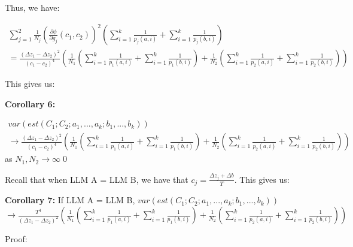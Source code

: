 \documentclass{article}
\begin{document}
Thus, we have:

$\displaystyle  \begin{array}{l}
\sum _{j=1}^{2}\frac{1}{N_{j}}\left(\frac{\partial \phi }{\partial g_{j}}\left( c_{1} ,c_{2}\right)\right)^{2}\left(\sum _{i=1}^{k}\frac{1}{p_{j}\left( a,i\right)} +\sum _{i=1}^{k}\frac{1}{p_{j}\left( b,i\right)}\right)\\
=\frac{\left( \Delta z_{1} -\Delta z_{2}\right)^{2}}{\left( c_{1} -c_{2}\right)^{4}}\left(\frac{1}{N_{1}}\left(\sum _{i=1}^{k}\frac{1}{p_{1}\left( a,i\right)} +\sum _{i=1}^{k}\frac{1}{p_{1}\left( b,i\right)}\right) +\frac{1}{N_{2}}\left(\sum _{i=1}^{k}\frac{1}{p_{2}\left( a,i\right)} +\sum _{i=1}^{k}\frac{1}{p_{2}\left( b,i\right)}\right)\right)
\end{array}$



This gives us:



\textbf{Corollary 6:}

$\displaystyle  \begin{array}{l}
var\left( est\left( C_{1} ;C_{2} ;a_{1} ,...,a_{k} ;b_{1} ,...,b_{k}\right)\right)\\
\rightarrow \frac{\left( \Delta z_{1} -\Delta z_{2}\right)^{2}}{\left( c_{1} -c_{2}\right)^{4}}\left(\frac{1}{N_{1}}\left(\sum _{i=1}^{k}\frac{1}{p_{1}\left( a,i\right)} +\sum _{i=1}^{k}\frac{1}{p_{1}\left( b,i\right)}\right) +\frac{1}{N_{2}}\left(\sum _{i=1}^{k}\frac{1}{p_{2}\left( a,i\right)} +\sum _{i=1}^{k}\frac{1}{p_{2}\left( b,i\right)}\right)\right)
\end{array}$ as $\displaystyle N_{1} ,N_{2}\rightarrow \infty $\qed 



Recall that when LLM A = LLM B, we have that $\displaystyle c_{j} =\frac{\Delta z_{j} +\Delta b}{T}$. This gives us:



\textbf{Corollary 7:} If LLM A = LLM B, $var\left( est\left( C_{1} ;C_{2} ;a_{1} ,...,a_{k} ;b_{1} ,...,b_{k}\right)\right)$\\
$\rightarrow \frac{T^{4}}{\left( \Delta z_{1} -\Delta z_{2}\right)^{2}}\left(\frac{1}{N_{1}}\left(\sum _{i=1}^{k}\frac{1}{p_{1}\left( a,i\right)} +\sum _{i=1}^{k}\frac{1}{p_{1}\left( b,i\right)}\right) +\frac{1}{N_{2}}\left(\sum _{i=1}^{k}\frac{1}{p_{2}\left( a,i\right)} +\sum _{i=1}^{k}\frac{1}{p_{2}\left( b,i\right)}\right)\right)$



Proof:
\end{document}
